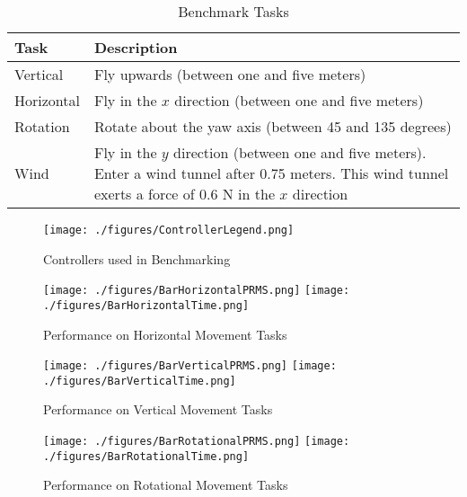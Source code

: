 \documentclass[letterpaper,12pt,titlepage,oneside,final]{book}
\begin{document}
\begin{table}
\caption{Benchmark Tasks} \label{table:tasks}
\begin{center}
\begin{tabular}{| l | p{9cm} |}

\hline
\textbf{Task} & \textbf{Description} \\ \hline
Vertical & Fly upwards (between one and five meters) \\ \hline
Horizontal & Fly in the $x$ direction (between one and five meters) \\ \hline
Rotation & Rotate about the yaw axis (between 45 and 135 degrees) \\ \hline
Wind & Fly in the $y$ direction (between one and five meters). Enter a wind tunnel after 0.75 meters. This wind tunnel exerts a force of 0.6 N in the $x$ direction \\ \hline

\end{tabular}
\end{center}
\end{table}

\begin{figure}
\centering
\texttt{[image: ./figures/ControllerLegend.png]}
\caption{Controllers used in Benchmarking}\label{fig:bar_legend}
\end{figure}

\begin{figure}
\centering
\texttt{[image: ./figures/BarHorizontalPRMS.png]}
\texttt{[image: ./figures/BarHorizontalTime.png]}
\caption{Performance on Horizontal Movement Tasks}\label{fig:bar_horizontal}
\captionsetup{singlelinecheck=off,font=footnotesize}
\caption*{}
\end{figure}

\begin{figure}
\centering
\texttt{[image: ./figures/BarVerticalPRMS.png]}
\texttt{[image: ./figures/BarVerticalTime.png]}
\caption{Performance on Vertical Movement Tasks}\label{fig:bar_vertical}
\captionsetup{singlelinecheck=off,font=footnotesize}
\caption*{}
\end{figure}

\begin{figure}
\centering
\texttt{[image: ./figures/BarRotationalPRMS.png]}
\texttt{[image: ./figures/BarRotationalTime.png]}
\caption{Performance on Rotational Movement Tasks}\label{fig:bar_rotational}
\captionsetup{singlelinecheck=off,font=footnotesize}
\caption*{}
\end{figure}
\end{document}
